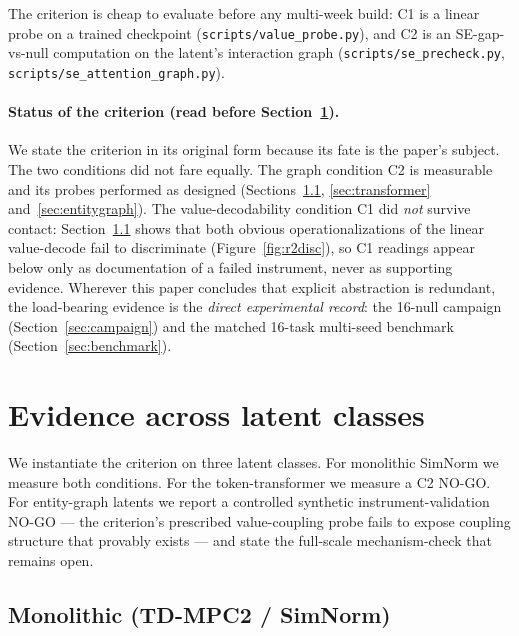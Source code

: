 \documentclass{article}
\begin{document}
The criterion is cheap to evaluate before any multi-week build: C1 is a linear probe on a trained checkpoint (\texttt{scripts/value\_probe.py}), and C2 is an SE-gap-vs-null computation on the latent's interaction graph (\texttt{scripts/se\_precheck.py}, \texttt{scripts/se\_attention\_graph.py}).

\paragraph{Status of the criterion (read before Section~\ref{sec:evidence}).} We state the criterion in its original form because its fate is the paper's subject. The two conditions did not fare equally. The graph condition C2 is measurable and its probes performed as designed (Sections~\ref{sec:monolithic}, \ref{sec:transformer} and~\ref{sec:entitygraph}). The value-decodability condition C1 did \emph{not} survive contact: Section~\ref{sec:monolithic} shows that both obvious operationalizations of the linear value-decode fail to discriminate (Figure~\ref{fig:r2disc}), so C1 readings appear below only as documentation of a failed instrument, never as supporting evidence. Wherever this paper concludes that explicit abstraction is redundant, the load-bearing evidence is the \emph{direct experimental record}: the 16-null campaign (Section~\ref{sec:campaign}) and the matched 16-task multi-seed benchmark (Section~\ref{sec:benchmark}).

\section{Evidence across latent classes}
\label{sec:evidence}

We instantiate the criterion on three latent classes. For monolithic SimNorm we measure both conditions. For the token-transformer we measure a C2 NO-GO. For entity-graph latents we report a controlled synthetic instrument-validation NO-GO --- the criterion's prescribed value-coupling probe fails to expose coupling structure that provably exists --- and state the full-scale mechanism-check that remains open.

\subsection{Monolithic (TD-MPC2 / SimNorm)}
\label{sec:monolithic}
\end{document}

